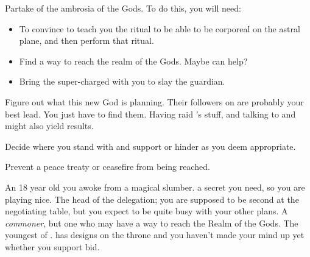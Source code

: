 \documentclass[char]{GL2020}
\begin{document}
\begin{itemz}[Goals]
	\item Partake of the ambrosia of the Gods. To do this, you will need:
	\begin{itemize}
		\item To convince \cDisney{} to teach you the ritual to be able to be corporeal on the astral plane, and then perform that ritual.
		\item Find a way to reach the realm of the Gods. Maybe \cCurse{} can help?
		\item Bring the super-charged \iScythe{} with you to slay the guardian.
	\end{itemize}
	\item Figure out what this new God is planning. Their followers on \pEarth{} are probably your best lead. You just have to find them. Having \cDisney{} raid \cBunker{}’s stuff, and talking to \cHeadScientist{} and \cAssistantScientist{} might also yield results.
	\item Decide where you stand with \cPrince{} and support or hinder \cPrince{\them} as you deem appropriate.
	\item Prevent a peace treaty or ceasefire from being reached.
\end{itemz}

\begin{itemz}[Notes]
	\item <NEEDS NOTE FOR THE RN>
\end{itemz}

\begin{contacts}
	\contact{\cDisney{}} An 18 year old \cDisney{\child} you awoke from a magical slumber. \cDisney{\They} \cDisney{\have} a secret you need, so you are playing nice.
	\contact{\cEvil{}} The head of the \pFarm{} delegation; you are supposed to be \cEvil{\their} second at the negotiating table, but you expect to be quite busy with your other plans.
	\contact{\cCurse{}} A \emph{commoner}, but one who may have a way to reach the Realm of the Gods.
	\contact{\cPrince{}} The youngest \cPrince{\child} of \cQueen{\Majesty} \cQueen{}. \cPrince{} has designs on the throne and you haven’t made your mind up yet whether you support \cPrince{\their} bid.
\end{contacts}
\end{document}
